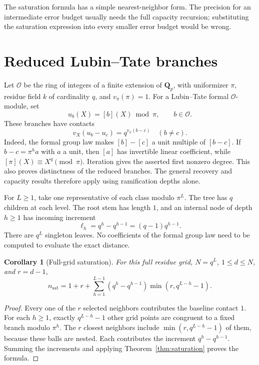 \documentclass[11pt]{article}
\newtheorem{corollary}[theorem]{Corollary}
\theoremstyle{definition}
\begin{document}
The saturation formula has a simple nearest-neighbor form. The precision for an intermediate error budget usually needs the full capacity recursion; substituting the saturation expression into every smaller error budget would be wrong.

\section{Reduced Lubin--Tate branches}\label{sec:LT}

Let $\mathcal O$ be the ring of integers of a finite extension of $\mathbf Q_p$, with uniformizer $\pi$, residue field $k$ of cardinality $q$, and $v_\pi(\pi)=1$. For a Lubin--Tate formal $\mathcal O$-module, set
\[
 u_b(X)=[b](X)\bmod\pi,\qquad b\in\mathcal O.
\]
These branches have contacts
\begin{equation}\label{eq:LTcontact}
 v_X(u_b-u_c)=q^{v_\pi(b-c)}\quad(b\ne c).
\end{equation}
Indeed, the formal group law makes $[b]-[c]$ a unit multiple of $[b-c]$. If $b-c=\pi^ha$ with $a$ a unit, then $[a]$ has invertible linear coefficient, while $[\pi](X)\equiv X^q\pmod\pi$. Iteration gives the asserted first nonzero degree. This also proves distinctness of the reduced branches. The general recovery and capacity results therefore apply using ramification depths alone.

For $L\ge1$, take one representative of each class modulo $\pi^L$. The tree has $q$ children at each level. The root stem has length $1$, and an internal node of depth $h\ge1$ has incoming increment
\[
 \ell_h=q^h-q^{h-1}=(q-1)q^{h-1}.
\]
There are $q^L$ singleton leaves. No coefficients of the formal group law need to be computed to evaluate the exact distance.

\begin{corollary}[Full-grid saturation]\label{cor:grid}
For this full residue grid, $N=q^L$, $1\le d\le N$, and $r=d-1$,
\begin{equation}\label{eq:gridsat}
 \boxed{\displaystyle n_{\mathrm{sat}}
 =1+r+\sum_{h=1}^{L-1}(q^h-q^{h-1})\min(r,q^{L-h}-1).}
\end{equation}
\end{corollary}

\begin{proof}
Every one of the $r$ selected neighbors contributes the baseline contact $1$. For each $h\ge1$, exactly $q^{L-h}-1$ other grid points are congruent to a fixed branch modulo $\pi^h$. The $r$ closest neighbors include $\min(r,q^{L-h}-1)$ of them, because these balls are nested. Each contributes the increment $q^h-q^{h-1}$. Summing the increments and applying Theorem~\ref{thm:saturation} proves the formula.
\end{proof}
\end{document}
